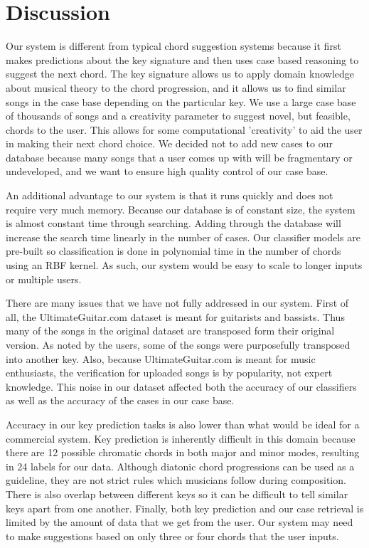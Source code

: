 \documentclass[letterpaper]{article}
\begin{document}
\section{Discussion}

Our system is different from typical chord suggestion systems because it first makes predictions about the key signature and then uses case based reasoning to suggest the next chord. The key signature allows us to apply domain knowledge about musical theory to the chord progression, and it allows us to find similar songs in the case base depending on the particular key.  We use a large case base of thousands of songs and a creativity parameter to suggest novel, but feasible, chords to the user.  This allows for some computational 'creativity' to aid the user in making their next chord choice. We decided not to add new cases to our database because many songs that a user comes up with will be fragmentary or undeveloped, and we want to ensure high quality control of our case base.

An additional advantage to our system is that it runs quickly and does not require very much memory.  Because our database is of constant size, the system is almost constant time through searching. Adding through the database will increase the search time linearly in the number of cases.  Our classifier models are pre-built so classification is done in polynomial time in the number of chords using an RBF kernel.  As such, our system would be easy to scale to longer inputs or multiple users.

There are many issues that we have not fully addressed in our system. First of all, the UltimateGuitar.com dataset is meant for guitarists and bassists. Thus many of the songs in the original dataset are transposed form their original version. As noted by the users, some of the songs were purposefully transposed into another key. Also, because UltimateGuitar.com is meant for music enthusiasts, the verification for uploaded songs is by popularity, not expert knowledge.  This noise in our dataset affected both the accuracy of our classifiers as well as the accuracy of the cases in our case base.

Accuracy in our key prediction tasks is also lower than what would be ideal for a commercial system.  Key prediction is inherently difficult in this domain because there are 12 possible chromatic chords in both major and minor modes, resulting in 24 labels for our data.  Although diatonic chord progressions can be used as a guideline, they are not strict rules which musicians follow during composition.  There is also overlap between different keys so it can be difficult to tell similar keys apart from one another.  Finally, both key prediction and our case retrieval is limited by the amount of data that we get from the user.  Our system may need to make suggestions based on only three or four chords that the user inputs.
\end{document}
